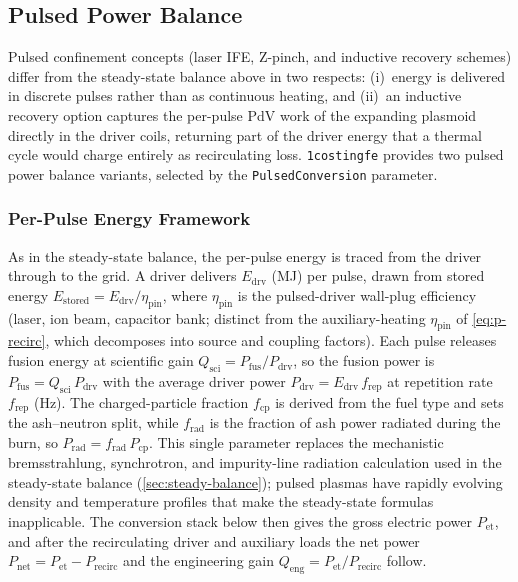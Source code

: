 \documentclass{article}
\begin{document}
\subsection{Pulsed Power Balance}
\label{sec:pulsed-balance}

Pulsed confinement concepts (laser IFE, Z-pinch, and inductive
recovery schemes) differ from the steady-state balance above in two
respects: (i)~energy is delivered in discrete pulses rather than as
continuous heating, and (ii)~an inductive recovery option captures the
per-pulse PdV work of the expanding plasmoid directly in the driver coils,
returning part of the driver energy that a thermal cycle would charge
entirely as recirculating loss. \texttt{1costingfe}
provides two pulsed power balance variants, selected by the
\texttt{PulsedConversion} parameter.

\subsubsection{Per-Pulse Energy Framework}
As in the steady-state balance, the per-pulse energy is traced from the
driver through to the grid. A driver delivers $E_{\text{drv}}$ (MJ) per pulse,
drawn from stored energy $E_{\text{stored}} = E_{\text{drv}} /
\eta_{\text{pin}}$, where $\eta_{\text{pin}}$ is the pulsed-driver wall-plug
efficiency (laser, ion beam, capacitor bank; distinct from the
auxiliary-heating $\eta_{\text{pin}}$ of \cref{eq:p-recirc}, which decomposes
into source and coupling factors). Each pulse releases fusion energy at
scientific gain $Q_{\text{sci}} = P_{\text{fus}} / P_{\text{drv}}$, so the
fusion power is $P_{\text{fus}} = Q_{\text{sci}} \, P_{\text{drv}}$ with the
average driver power $P_{\text{drv}} = E_{\text{drv}} \, f_{\text{rep}}$ at
repetition rate $f_{\text{rep}}$ (Hz). The charged-particle fraction
$f_{\text{cp}}$ is derived from the fuel type and sets the ash--neutron
split, while $f_{\text{rad}}$ is the fraction of ash power radiated during
the burn, so $P_{\text{rad}} = f_{\text{rad}} \, P_{\text{cp}}$. This single
parameter replaces the mechanistic bremsstrahlung, synchrotron, and
impurity-line radiation calculation used in the steady-state balance
(\cref{sec:steady-balance}); pulsed plasmas have rapidly evolving density
and temperature profiles that make the steady-state formulas inapplicable.
The conversion stack below then gives the gross electric power
$P_{\text{et}}$, and after the recirculating driver and auxiliary loads the
net power $P_{\text{net}} = P_{\text{et}} - P_{\text{recirc}}$ and the
engineering gain $Q_{\text{eng}} = P_{\text{et}} / P_{\text{recirc}}$ follow.
\end{document}
